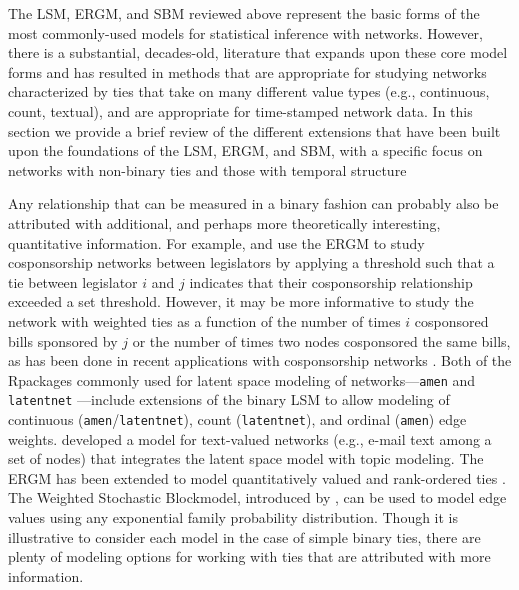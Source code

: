 \documentclass[fleqn,12pt]{wlscirep}
\newcommand{\R}{\textsf{R}\space} %
\begin{document}
The LSM, ERGM, and SBM reviewed above represent the basic forms of the most commonly-used models for statistical inference with networks. However, there is a substantial, decades-old, literature that expands upon these core model forms and has resulted in methods that are appropriate for studying networks characterized by ties that take on many different value types (e.g., continuous, count, textual), and are appropriate for time-stamped network data. In this section we provide a brief review of the different extensions that have been built upon the foundations of the LSM, ERGM, and SBM, with a specific focus on networks with non-binary ties and those with temporal structure

Any relationship that can be measured in a binary fashion can probably also be attributed with additional, and perhaps more theoretically interesting, quantitative information. For example, \citet{cranmer2011inferential} and \citet{baller2017specialists}  use the ERGM to study cosponsorship networks between legislators by applying a threshold such that a tie between legislator $i$ and $j$ indicates that their cosponsorship relationship exceeded a set threshold. However, it may be more informative to study the network with weighted ties as a function of the number of times $i$ cosponsored bills sponsored by $j$ or the number of times two nodes cosponsored the same bills, as has been done in recent applications with cosponsorship networks \citep[e.g., ][]{kirkland2012multimember, signorelli2018penalized}. Both of the \R packages commonly used for latent space modeling of networks---\texttt{amen} \citep{amen} and \texttt{latentnet} \citep{latentnet}---include extensions of the binary LSM to allow modeling of continuous (\texttt{amen}/\texttt{latentnet}), count (\texttt{latentnet}), and ordinal (\texttt{amen}) edge weights. \cite{krafft2012topic} developed a model for text-valued networks (e.g., e-mail text among a set of nodes) that integrates the latent space model with topic modeling. The ERGM has been extended to model quantitatively valued and rank-ordered ties \citep{wyatt2009dynamic, krivitsky2012exponential,desmarais2012statistical, krivitsky2017exponential}. The Weighted Stochastic Blockmodel, introduced by \cite{aicher2014learning}, can be used to model edge values using any exponential family probability distribution. Though it is illustrative to consider each model in the case of simple binary ties, there are plenty of modeling options for working with ties that are attributed with more information.
\end{document}
